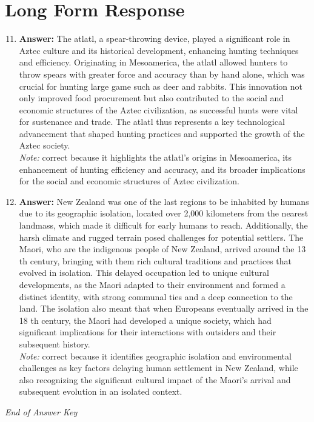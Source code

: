 \documentclass[12pt]{article}
\begin{document}
\section*{Long Form Response}
\begin{enumerate}[label=\arabic*.]
\setcounter{enumi}{10}
\item \textbf{Answer:} The atlatl, a spear-throwing device, played a significant role in Aztec culture and its historical development, enhancing hunting techniques and efficiency. Originating in Mesoamerica, the atlatl allowed hunters to throw spears with greater force and accuracy than by hand alone, which was crucial for hunting large game such as deer and rabbits. This innovation not only improved food procurement but also contributed to the social and economic structures of the Aztec civilization, as successful hunts were vital for sustenance and trade. The atlatl thus represents a key technological advancement that shaped hunting practices and supported the growth of the Aztec society.
\\ \textit{Note:} correct because it highlights the atlatl's origins in Mesoamerica, its enhancement of hunting efficiency and accuracy, and its broader implications for the social and economic structures of Aztec civilization.
\item \textbf{Answer:} New Zealand was one of the last regions to be inhabited by humans due to its geographic isolation, located over 2,000 kilometers from the nearest landmass, which made it difficult for early humans to reach. Additionally, the harsh climate and rugged terrain posed challenges for potential settlers. The Maori, who are the indigenous people of New Zealand, arrived around the 13 th century, bringing with them rich cultural traditions and practices that evolved in isolation. This delayed occupation led to unique cultural developments, as the Maori adapted to their environment and formed a distinct identity, with strong communal ties and a deep connection to the land. The isolation also meant that when Europeans eventually arrived in the 18 th century, the Maori had developed a unique society, which had significant implications for their interactions with outsiders and their subsequent history.
\\ \textit{Note:} correct because it identifies geographic isolation and environmental challenges as key factors delaying human settlement in New Zealand, while also recognizing the significant cultural impact of the Maori's arrival and subsequent evolution in an isolated context.
\end{enumerate}

\vfill
\noindent\textit{End of Answer Key}
\end{document}
